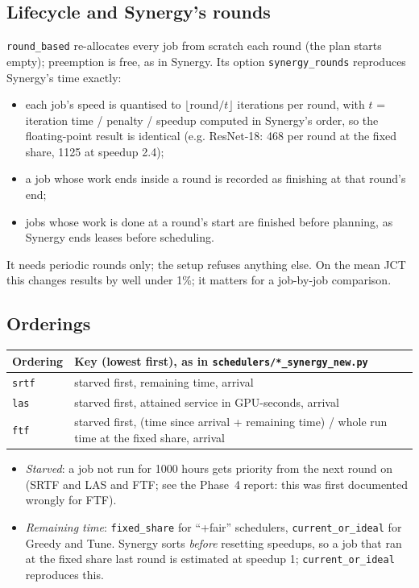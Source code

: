 \documentclass[11pt,a4paper]{article}
\newcommand{\code}[1]{\texttt{#1}}
\begin{document}
\subsection{Lifecycle and Synergy's rounds}
\code{round\_based} re-allocates every job from scratch each round (the plan starts empty); preemption is
free, as in Synergy. Its option \code{synergy\_rounds} reproduces Synergy's time exactly:
\begin{itemize}
  \item each job's speed is quantised to \(\lfloor \text{round} / t \rfloor\) iterations per round, with
        \(t\) = iteration time / penalty / speedup computed in Synergy's order, so the floating-point
        result is identical (e.g. ResNet-18: 468 per round at the fixed share, 1125 at speedup 2.4);
  \item a job whose work ends inside a round is recorded as finishing at that round's end;
  \item jobs whose work is done at a round's start are finished before planning, as Synergy ends leases
        before scheduling.
\end{itemize}
It needs periodic rounds only; the setup refuses anything else. On the mean JCT this changes results by
well under 1\%; it matters for a job-by-job comparison.

\subsection{Orderings}
\begin{center}
\begin{tabularx}{\linewidth}{@{}lX@{}}
\toprule
Ordering & Key (lowest first), as in \code{schedulers/*\_synergy\_new.py} \\
\midrule
\code{srtf} & starved first, remaining time, arrival \\
\code{las} & starved first, attained service in GPU-seconds, arrival \\
\code{ftf} & starved first, (time since arrival + remaining time) / whole run time at the fixed share, arrival \\
\bottomrule
\end{tabularx}
\end{center}
\begin{itemize}
  \item \emph{Starved}: a job not run for 1000 hours gets priority from the next round on (SRTF and LAS
        and FTF; see the Phase~4 report: this was first documented wrongly for FTF).
  \item \emph{Remaining time}: \code{fixed\_share} for ``+fair'' schedulers, \code{current\_or\_ideal} for
        Greedy and Tune. Synergy sorts \emph{before} resetting speedups, so a job that ran at the fixed
        share last round is estimated at speedup 1; \code{current\_or\_ideal} reproduces this.
\end{itemize}
\end{document}
